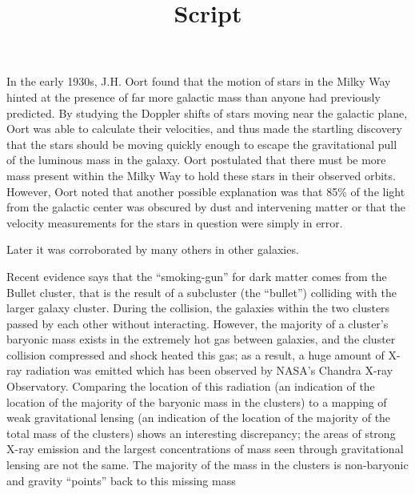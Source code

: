 \documentclass[12pt,letterpaper]{article}
\title{Script}
\begin{document}
	
	\begin{tcolorbox}[title= Slide 2]
	
	

	In the early 1930s, J.H. Oort found that the motion of stars in the Milky Way hinted at the presence of far more
	galactic mass than anyone had previously predicted. By studying the Doppler shifts of stars moving near the galactic
	plane, Oort was able to calculate their velocities, and thus made the startling discovery that the stars should be
	moving quickly enough to escape the gravitational pull of the luminous mass in the galaxy. Oort postulated that
	there must be more mass present within the Milky Way to hold these stars in their observed orbits. However, Oort
	noted that another possible explanation was that 85\% of the light from the galactic center was obscured by dust and
	intervening matter or that the velocity measurements for the stars in question were simply in error.
	
	Later it was corroborated by many others in other galaxies.
	\end{tcolorbox}

	\begin{tcolorbox}[title= Slide 3]
	
	Recent evidence says that the “smoking-gun” for dark matter comes from the Bullet cluster, that is the result of a subcluster (the “bullet”)
	colliding with the larger galaxy cluster. During the collision, the galaxies within the two clusters passed by each other 
	without interacting. However, the majority of a cluster’s baryonic mass exists in the extremely hot gas between galaxies, and the 
	cluster collision compressed and shock heated this gas; as a result, a huge amount of X-ray radiation was emitted which has 
	been observed by NASA’s Chandra X-ray Observatory. Comparing the location of this radiation (an indication of the location of the 
	majority of the baryonic mass in the clusters) to a mapping of weak gravitational lensing (an indication of the location of the majority
	of the total mass of the clusters) shows an interesting discrepancy; the areas of strong X-ray emission and the largest
	concentrations of mass seen through gravitational lensing are not the same. The majority of the mass in the clusters
	is non-baryonic and gravity “points” back to this missing mass	
	
	\end{tcolorbox}
\end{document}
